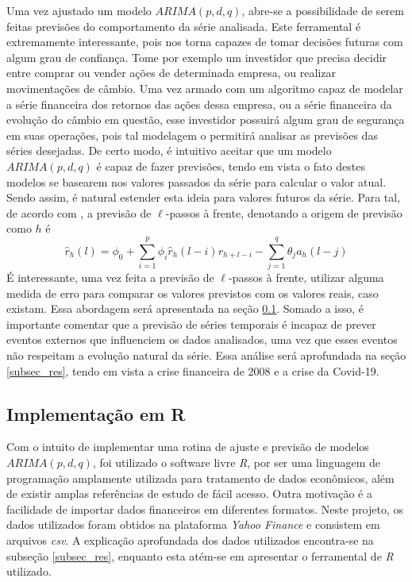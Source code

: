 \documentclass[12pt]{article}
\begin{document}
Uma vez ajustado um modelo $ARIMA(p,d,q)$, abre-se a possibilidade de serem feitas previsões do comportamento da série analisada. Este ferramental é extremamente interessante, pois nos torna capazes de tomar decisões futuras com algum grau de confiança. Tome por exemplo um investidor que precisa decidir entre comprar ou vender ações de determinada empresa, ou realizar movimentações de câmbio. Uma vez armado com um algoritmo capaz de modelar a série financeira dos retornos das ações dessa empresa, ou a série financeira da evolução do câmbio em questão, esse investidor possuirá algum grau de segurança em suas operações, pois tal modelagem o permitirá analisar as previsões das séries desejadas. De certo modo, é intuitivo aceitar que um modelo $ARIMA(p,d,q)$ é capaz de fazer previsões, tendo em vista o fato destes modelos se basearem nos valores passados da série para calcular o valor atual. Sendo assim, é natural estender esta ideia para valores futuros da série. Para tal, de acordo com \cite{Tsay}, a previsão de {$\ell$}-passos à frente, denotando a origem de previsão como $h$ é  
\begin{equation}\label{eq_for_arma}
\hat{r}_{h}(l)=\phi_{0}+\sum_{i=1}^{p}\phi_{i}\hat{r}_{h}(l-i)r_{h+l-i}-\sum_{j=1}^{q}\theta_{j}a_{h}(l-j)
\end{equation}
É interessante, uma vez feita a previsão de {$\ell$}-passos à frente, utilizar alguma medida de erro para comparar os valores previstos com os valores reais, caso existam. Essa abordagem será apresentada na seção \ref{subsec_R}. Somado a isso, é importante comentar que a previsão de séries temporais é incapaz de prever eventos externos que influenciem os dados analisados, uma vez que esses eventos não respeitam a evolução natural da série. Essa análise será aprofundada na seção \ref{subsec_res}, tendo em vista a crise financeira de 2008 e a crise da Covid-19.

\subsection{Implementação em R}\label{subsec_R}
Com o intuito de implementar uma rotina de ajuste e previsão de modelos $ARIMA(p,d,q)$, foi utilizado o software livre \emph{R}, por ser uma linguagem de programação amplamente utilizada para tratamento de dados econômicos, além de existir amplas referências de estudo de fácil acesso. Outra motivação é a facilidade de importar dados financeiros em diferentes formatos. Neste projeto, os dados utilizados foram obtidos na plataforma \textit{Yahoo Finance} e consistem em arquivos \textit{csv}. A explicação aprofundada dos dados utilizados encontra-se na subseção \ref{subsec_res}, enquanto esta atém-se em apresentar o ferramental de \emph{R} utilizado.
\end{document}
